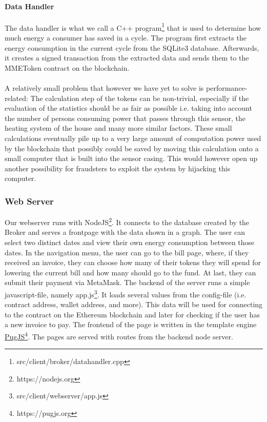 \documentclass[11pt]{article}
\begin{document}
\paragraph{Data Handler}
The data handler is what we call a C++ program\footnote{src/client/broker/datahandler.cpp} that is used to determine how much energy a consumer has saved in a cycle. The program first extracts the energy consumption in the current cycle from the SQLite3 database. Afterwards, it creates a signed transaction from the extracted data and sends them to the MMEToken contract on the blockchain.\\\\
A relatively small problem that however we have yet to solve is performance-related: The calculation step of the tokens can be non-trivial, especially if the evaluation of the statistics should be as fair as possible i.e. taking into account the number of persons consuming power that passes through this sensor, the heating system of the house and many more similar factors. These small calculations eventually pile up to a very large amount of computation power used by the blockchain that possibly could be saved by moving this calculation onto a small computer
that is built into the sensor casing. This would however open up another possibility for fraudsters to exploit the system by hijacking this computer.

\subsubsection{Web Server}
Our webserver runs with NodeJS\footnote{https://nodejs.org}. It connects to the database created by the Broker and serves a frontpage with the data shown in a graph. The user can select two distinct dates and view their own energy consumption between those dates. In the navigation menu, the user can go to the bill page, where, if they received an invoice, they can choose how many of their tokens they will spend for lowering the current bill and how many should go to the fund. At last, they can submit their payment via MetaMask. The backend of the server runs a simple javascript-file, namely app.js\footnote{src/client/webserver/app.js}. It loads several values from the config-file (i.e. contract address, wallet address, and more). This data will be used for connecting to the contract on the Ethereum blockchain and later for checking if the user has a new invoice to pay. The frontend of the page is written in the template engine \hyperref[https://pugjs.org]{PugJS}\footnote{https://pugjs.org}. The pages are served with routes from the backend node server.
\end{document}
